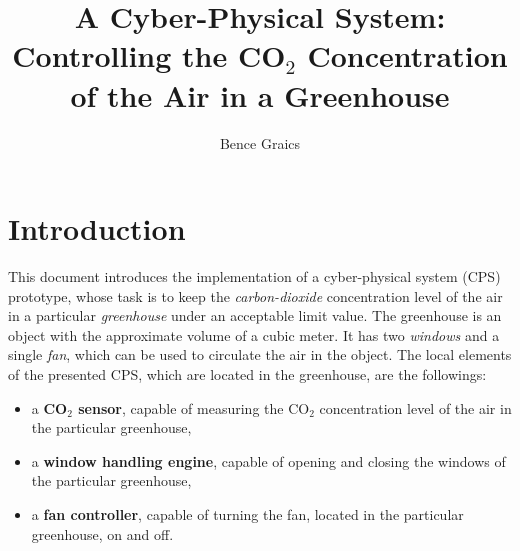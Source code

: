 \documentclass[a4paper, 11pt]{article}
\begin{document}
	
	\newcommand{\cmark}{\ding{51}}%
	\newcommand{\xmark}{\ding{55}}%
	
	\newcommand{\specialcell}[2][c]{%
		\begin{tabular}[#1]{@{}c@{}}#2\end{tabular}}
	
	\newenvironment*{mytable}[3]{
		\begin{table}[htbp]	
			\caption{#1}          
			\label{tab:#2}            
			\center%
			\begin{tabular}{#3}
			}
			{
			\end{tabular}
		\end{table}
	}
	
	\pagestyle{plain}
	
	
	
	\nonfrenchspacing
	\setlength{\parindent}{0em}
	\setlength{\parskip}{0.45em}
	
	\title{A Cyber-Physical System:\\Controlling the CO$_2$ Concentration of the Air in a Greenhouse}
	\date{}
	\author{Bence Graics}	
	
	\maketitle
	\tableofcontents
	\newpage
	\section*{Introduction}
	This document introduces the implementation of a cyber-physical system (CPS) prototype, whose task is to keep the \emph{carbon-dioxide} concentration level of the air in a particular \emph{greenhouse} under an acceptable limit value.
	The greenhouse is an object with the approximate volume of a cubic meter. It has two \emph{windows} and a single \emph{fan}, which can be used to circulate the air in the object. The local elements of the presented CPS, which are located in the greenhouse, are the followings:
	\begin{itemize}
		\item a \textbf{CO$_2$ sensor}, capable of measuring the CO$_2$ concentration level of the air in the particular greenhouse,
		\item a \textbf{window handling engine}, capable of opening and closing the windows of the particular greenhouse,
		\item a \textbf{fan controller}, capable of turning the fan, located in the particular greenhouse, on and off.
	\end{itemize}
	
\end{document}
